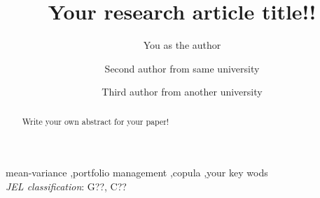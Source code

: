 \begin{frontmatter}
\title{Your research article title!!}






\author[uqbs1]{You as the author}
\author[uqbs1]{Second author from same university}%
\author[ncc]{Third author from another university}%


\address[uqbs1]{UQ Business School, University of Queensland, Brisbane, 4072, Australia}
\address[ncc]{Another University}




\begin{abstract}
Write your own abstract for your paper!


\end{abstract}




\begin{keyword}
mean-variance \sep portfolio management \sep copula \sep your key wods  \\
\emph{JEL classification}: G??, C?? \\
\end{keyword}

\end{frontmatter}
